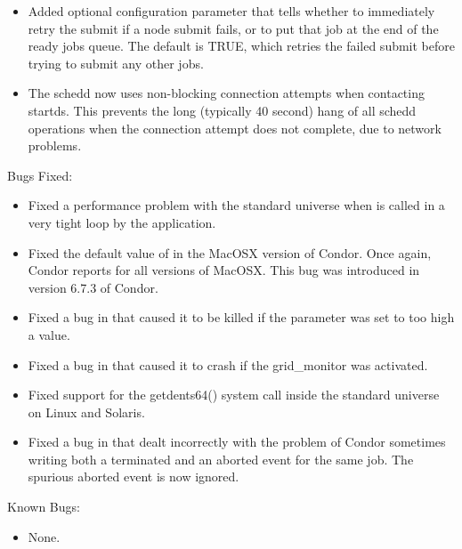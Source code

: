 \begin{itemize}
\item Added optional  configuration
parameter that tells  whether to immediately retry
the submit if a node submit fails, or to put that job at the end of
the ready jobs queue.  The default is TRUE, which retries the failed
submit before trying to submit any other jobs.

\item The schedd now uses non-blocking connection attempts when contacting
startds.  This prevents the long (typically 40 second) hang of all schedd
operations when the connection attempt does not complete, due to
network problems.

\end{itemize}

\noindent Bugs Fixed:

\begin{itemize}

\item Fixed a performance problem with the standard universe when
 is called in a very tight loop by the application.

\item Fixed the default value of  in the MacOSX version
  of Condor.
  Once again, Condor reports \verb@OSX@ for all versions of MacOSX.
  This bug was introduced in version 6.7.3 of Condor.

\item Fixed a bug in  that caused it to be killed if
the  parameter was set to too
high a value.

\item Fixed a bug in  that caused it to crash if
the grid\_monitor was activated.

\item Fixed support for the getdents64() system call inside the
  standard universe on Linux and Solaris.

\item Fixed a bug in  that dealt
incorrectly with the problem of Condor sometimes writing both a
terminated and an aborted event for the same job. The spurious
aborted event is now ignored.

\end{itemize}

\noindent Known Bugs:

\begin{itemize}

\item None.

\end{itemize}


